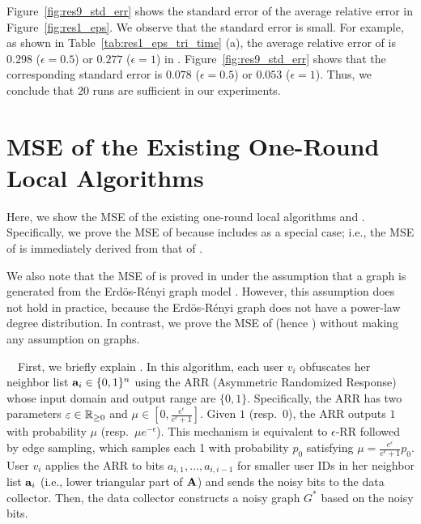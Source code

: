Figure~\ref{fig:res9_std_err} shows the standard error of the average relative error in Figure~\ref{fig:res1_eps}. 
We observe that the standard error is small. 
For example, as shown in Table~\ref{tab:res1_eps_tri_time} (a), the average relative error of \AlgWSTriVR{} is $0.298$ ($\epsilon=0.5$) or $0.277$ ($\epsilon=1$) in \Gplus{}. 
Figure~\ref{fig:res9_std_err} shows that the corresponding standard error is $0.078$ ($\epsilon=0.5$) or $0.053$ ($\epsilon=1$). Thus, we conclude that $20$ runs are sufficient in our experiments. 

\section{MSE of the Existing One-Round Local Algorithms}
\label{sec:upper}

Here, we show the MSE of the existing one-round local algorithms \AlgARRTri{} \cite{Imola_USENIX22} and \AlgRRTri{} \cite{Imola_USENIX21}.
Specifically, we prove the MSE of \AlgARRTri{} because \AlgARRTri{} includes \AlgRRTri{} as a special case; i.e., the MSE of \AlgRRTri{} is immediately derived from that of \AlgARRTri{}.

We also note that the MSE of \AlgRRTri{} is proved in \cite{Imola_USENIX21} under the assumption that a graph is generated from the Erd\"os-R\'enyi graph model \cite{NetworkScience}.
However, this assumption does not hold in practice, because the Erd\"os-R\'enyi graph does not have a power-law degree distribution.
In contrast, we prove the MSE of \AlgARRTri{} (hence \AlgRRTri{}) without making any assumption on graphs.


\smallskip
{}~~First, we briefly explain \AlgARRTri{}.
In this algorithm, each user $v_i$ obfuscates her neighbor list $\mathbf{a}_i \in \{0,1\}^n$ using the ARR (Asymmetric Randomized Response) whose input domain and output range are $\{0,1\}$.
Specifically, the ARR has two parameters $\varepsilon \in \mathbb{R}_{\ge0}$ and $\mu \in [0,\frac{e^\epsilon}{e^\epsilon + 1}]$.
Given $1$ (resp.~$0$), the ARR outputs $1$ with probability $\mu$ (resp.~$\mu e^{-\epsilon}$).
This mechanism is equivalent to $\epsilon$-RR
followed by edge sampling, which samples each 1 with probability $p_0$ satisfying $\mu = \frac{e^\epsilon}{e^\epsilon+1} p_0$.
User $v_i$ applies the ARR to bits $a_{i,1}, \ldots, a_{i,i-1}$ for smaller user IDs in her neighbor list $\mathbf{a}_i$ (i.e., lower triangular part of $\mathbf{A}$) and sends the noisy bits to the data collector.
Then, the data collector constructs a noisy graph $G^*$ based on the noisy bits.

